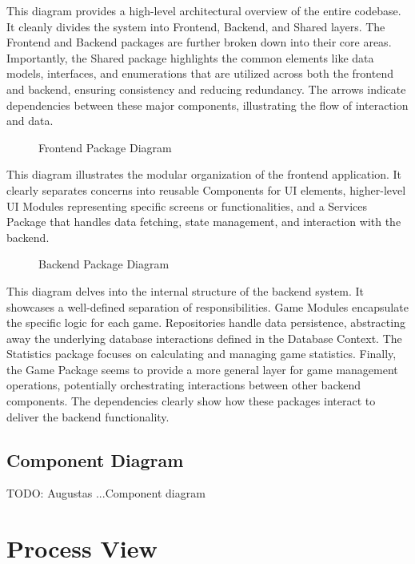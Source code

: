 \documentclass[11pt,a4paper]{article}
\newcommand{\inputdiagram}[1]{}
\newcommand{\textwidthdiagram}[2][1]{%
  \resizebox{#1\textwidth}{!}{\inputdiagram{#2}}%
}
\begin{document}
This diagram provides a high-level architectural overview of the entire codebase. It cleanly divides the system into Frontend, Backend, and Shared layers. The Frontend and Backend packages are further broken down into their core areas. Importantly, the Shared package highlights the common elements like data models, interfaces, and enumerations that are utilized across both the frontend and backend, ensuring consistency and reducing redundancy. The arrows indicate dependencies between these major components, illustrating the flow of interaction and data.

\begin{figure}[H]
    \centering
    \textwidthdiagram{frontend_package.latex}
    \caption{Frontend Package Diagram}
    \label{fig:frontend_package}
\end{figure}

This diagram illustrates the modular organization of the frontend application. It clearly separates concerns into reusable Components for UI elements, higher-level UI Modules representing specific screens or functionalities, and a Services Package that handles data fetching, state management, and interaction with the backend.

\begin{figure}[H]
    \centering
    \textwidthdiagram{backend_package.latex}
    \caption{Backend Package Diagram}
    \label{fig:backend_package}
\end{figure}

This diagram delves into the internal structure of the backend system. It showcases a well-defined separation of responsibilities. Game Modules encapsulate the specific logic for each game. Repositories handle data persistence, abstracting away the underlying database interactions defined in the Database Context. The Statistics package focuses on calculating and managing game statistics. Finally, the Game Package seems to provide a more general layer for game management operations, potentially orchestrating interactions between other backend components. The dependencies clearly show how these packages interact to deliver the backend functionality.

\subsection{Component Diagram}
TODO: Augustas
...Component diagram

\section{Process View}
\end{document}
